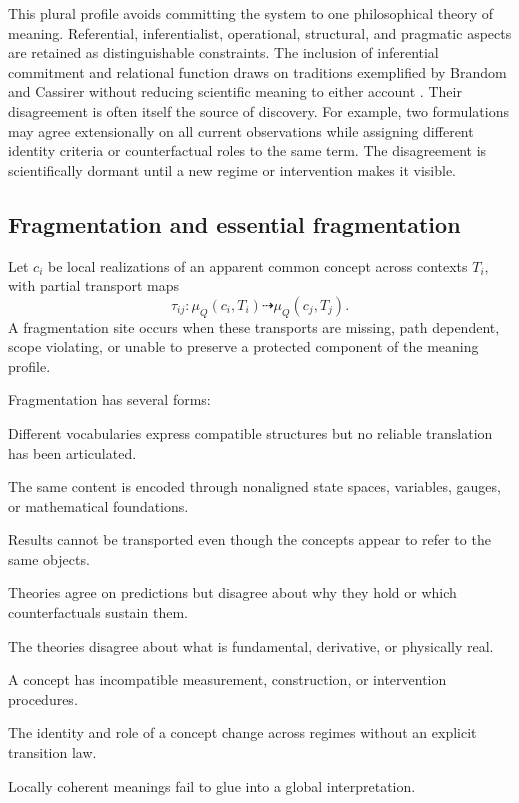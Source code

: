\documentclass[11pt]{article}
\begin{document}
This plural profile avoids committing the system to one philosophical theory of meaning. Referential,
inferentialist, operational, structural, and pragmatic aspects are retained as distinguishable
constraints. The inclusion of inferential commitment and relational function draws on traditions
exemplified by Brandom and Cassirer without reducing scientific meaning to either account
\cite{brandom1994,cassirer1910}. Their disagreement is often itself the source of discovery. For
example, two formulations
may agree extensionally on all current observations while assigning different identity criteria or
counterfactual roles to the same term. The disagreement is scientifically dormant until a new regime
or intervention makes it visible.

\subsection{Fragmentation and essential fragmentation}

Let $c_i$ be local realizations of an apparent common concept across contexts $T_i$, with partial
transport maps
\begin{equation}
\tau_{ij}:\mu_Q(c_i,T_i)\dashrightarrow\mu_Q(c_j,T_j).
\end{equation}
A fragmentation site occurs when these transports are missing, path dependent, scope violating, or
unable to preserve a protected component of the meaning profile.

Fragmentation has several forms:
\begin{description}[leftmargin=3.0cm,style=nextline]
  \item[Lexical fragmentation.] Different vocabularies express compatible structures but no reliable
  translation has been articulated.
  \item[Representational fragmentation.] The same content is encoded through nonaligned state spaces,
  variables, gauges, or mathematical foundations.
  \item[Inferential fragmentation.] Results cannot be transported even though the concepts appear to
  refer to the same objects.
  \item[Explanatory fragmentation.] Theories agree on predictions but disagree about why they hold or
  which counterfactuals sustain them.
  \item[Ontological fragmentation.] The theories disagree about what is fundamental, derivative, or
  physically real.
  \item[Operational fragmentation.] A concept has incompatible measurement, construction, or
  intervention procedures.
  \item[Scale fragmentation.] The identity and role of a concept change across regimes without an
  explicit transition law.
  \item[Global fragmentation.] Locally coherent meanings fail to glue into a global interpretation.
\end{description}
\end{document}
